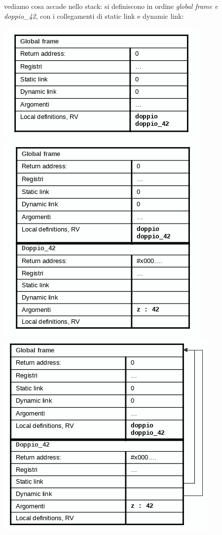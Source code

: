 \documentclass[a4paper,12pt, oneside]{book}
\begin{document}
vediamo cosa accade nello stack:
si definiscono in ordine \textit{global frame e doppio\_42}, con i collegamenti di static link e dynamic link:
\begin{center}
	\includegraphics[scale=0.4]{img/sta1.png}
	\quad
	\includegraphics[scale=0.4]{img/sta2.png}
	\quad
	\includegraphics[scale=0.4]{img/sta3.png}
\end{center}
\end{document}
